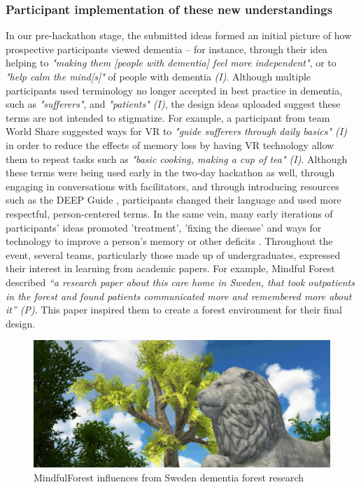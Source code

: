 \subsubsection{Participant implementation of these new understandings}
\label{ThemeOne:subthemeTwo}
In our pre-hackathon stage, the submitted ideas formed an initial picture of how prospective participants viewed dementia – for instance, through their idea helping to \textit{"making them [people with dementia] feel more independent"}, or to \textit{"help calm the mind[s]"} of people with dementia \textit{(I)}. Although multiple participants used terminology no longer accepted in best practice in dementia, such as \textit{"sufferers"}, and\textit{ "patients" (I)}, the design ideas uploaded suggest these terms are not intended to stigmatize. For example, a participant from team World Share suggested ways for VR to \textit{"guide sufferers through daily basics" (I)} in order to reduce the effects of memory loss by having VR technology allow them to repeat tasks such as \textit{"basic cooking, making a cup of tea" (I)}. Although these terms were being used early in the two-day hackathon as well, through engaging in conversations with facilitators, and through introducing resources such as the DEEP Guide \citep{diaries_deep_2020},  participants changed their language and used more respectful, person-centered terms. In the same vein, many early iterations of participants’ ideas promoted 'treatment', 'fixing the disease' and ways for technology to improve a person's memory or other deficits \citep{hendriks_valuing_2018}. Throughout the event, several teams, particularly those made up of undergraduates, expressed their interest in learning from academic papers. For example, Mindful Forest described \textit{“a research paper about this care home in Sweden, that took outpatients in the forest and found patients communicated more and remembered more about it” (P)}. This paper inspired them to create a forest environment for their final design.

\begin{figure}[htp]
\centering
\includegraphics[width=.8\linewidth]{Images/DemVR/Findings/MindfulForest.png}
\caption{MindfulForest influences from Sweden dementia forest research}
\label{fig:MindFulForestResearch}
\end{figure}

